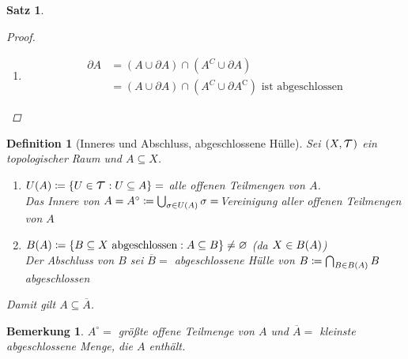 \documentclass[11pt, twoside, a4paper]{article}
\theoremstyle{plain}
\newtheorem{bemerkung}[blockelement]{Bemerkung}
\newtheorem{definition}[blockelement]{Definition}
\newtheorem{satz}[blockelement]{Satz}
\numberwithin{equation}{subsection}
\newcommand{\set}[1]{\left\{#1\right\}}
\newcommand{\pair}[1]{\left(#1\right)}
\newcommand{\of}[1]{\mathopen{}\mathclose{}\bgroup\left(#1\aftergroup\egroup\right)}
\newcommand{\equivalent}[0]{\Leftrightarrow{}}
\newcommand{\exclude}[0]{\setminus}
\renewcommand{\emptyset}{\varnothing}
\begin{document}
\begin{satz}
\begin{proof}
\begin{enumerate}[label=(\roman*)]
\begin{align*}
                    \equivalent \pair{A^{\mathrm{C}} \exclude \partial A}^{\mathrm{C}} &= X\exclude\pair{A^{\mathrm{C}} \exclude \partial A}\\
                    &= X\exclude A^{\mathrm{C}} \cup \partial A = A\cup \partial A \text{ ist abgeschlossen }
                \end{align*}
                \item
                \begin{align*}
                    \partial A &= \pair{A\cup \partial A} \cap \pair{A^C \cup \partial A}\\
                    &= \pair{A \cup \partial A} \cap \pair{A^C \cup \partial A^{\mathrm{C}}} \text{ ist abgeschlossen}
                \end{align*}
            \end{enumerate}
        \end{proof}
    \end{satz}

    \begin{definition}[Inneres und Abschluss, abgeschlossene Hülle]
        Sei $\pair{X, \Tau}$ ein topologischer Raum und $A\subseteq X$.
        \begin{enumerate}[label=(\roman*)]
            \item $U\of{A} \coloneqq \set{U\in\Tau: U\subseteq A}= $ alle offenen Teilmengen von $A$.\\
            Das Innere von $A = A^{\circ} \coloneqq \bigcup_{\sigma\in U\of{A}} \sigma= $Vereinigung aller offenen Teilmengen von $A$
            \item $B\of{A} \coloneqq \set{B\subseteq X \text{ abgeschlossen}: A \subseteq B} \neq \emptyset$ (da $X\in B\of{A}$)\\
            Der Abschluss von $B$ sei $\overline{B} =$ abgeschlossene Hülle von $B \coloneqq \bigcap_{B\in B\of{A}} B$ abgeschlossen
        \end{enumerate}
        Damit gilt $A \subseteq \overline{A}$.
    \end{definition}

    \begin{bemerkung}
        $A^{\circ} =$ größte offene Teilmenge von $A$ und $\overline{A} = $ kleinste abgeschlossene Menge, die $A$ enthält.
    \end{bemerkung}
\end{document}
